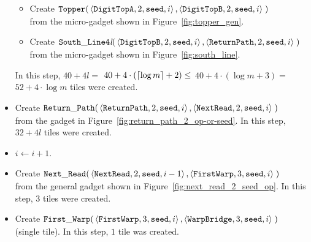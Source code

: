 \begin{itemize}
\begin{itemize}
        \item Create
        $\begin{aligned}[t]
            {\tt Topper}(& \left \langle {\tt DigitTopA}, 2, {\tt seed}, i \right\rangle,
                           \left \langle {\tt DigitTopB}, 2, {\tt seed}, i \right\rangle \;)
        \end{aligned}$\\ from the micro-gadget shown in Figure~\ref{fig:topper_gen}.

        \item Create
        $\begin{aligned}[t]
            {\tt South\_Line4\textit{l}}(&\left\langle {\tt DigitTopB},  2, {\tt seed}, i \right\rangle,
                                          \left\langle {\tt ReturnPath}, 2, {\tt seed}, i \right\rangle \;)
        \end{aligned}$\\ from the micro-gadget shown in Figure~\ref{fig:south_line}.
    \end{itemize}
    In this step, $40 + 4l =$
    $40 + 4 \cdot \left( \ceil*{\log m} + 2 \right) \leq$
    $40 + 4 \cdot \left( {\log m} + 3 \right) =$
    $52 + 4 \cdot {\log m}$ tiles were created.

    \item Create
    $\begin{aligned}[t]
        \returnpath(&\left\langle {\tt ReturnPath}, 2, {\tt seed}, i \right\rangle,
                     \left\langle {\tt NextRead},   2, {\tt seed}, i \right\rangle \;)
    \end{aligned}$\\ from the gadget in Figure~\ref{fig:return_path_2_op-or-seed}.
    In this step, $32 + 4l$ tiles were created.

    \item $i \gets i + 1$.

    \item Create
    $\begin{aligned}[t]
        \nextread(&\left\langle {\tt NextRead},  2, {\tt seed}, i - 1 \right\rangle,
                   \left\langle {\tt FirstWarp}, 3, {\tt seed}, i     \right\rangle \;)
    \end{aligned}$\\ from the general gadget shown in Figure~\ref{fig:next_read_2_seed_op}.
    In this step, $3$ tiles were created.

    \item Create
    $\begin{aligned}[t]
        \firstwarp(&\left\langle {\tt FirstWarp},  3, {\tt seed}, i \right\rangle,
                    \left\langle {\tt WarpBridge}, 3, {\tt seed}, i \right\rangle \;)
    \end{aligned}$ (single tile).
    In this step, $1$ tile was created.


\end{itemize}

